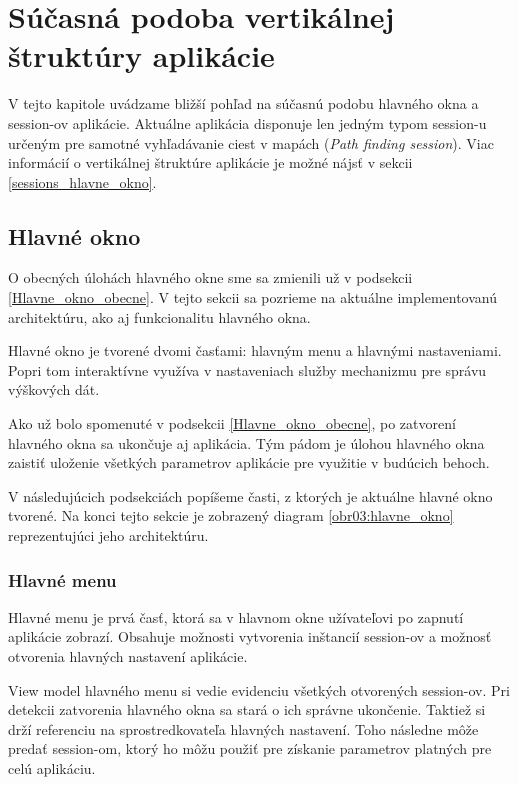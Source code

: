\chapter{Súčasná podoba vertikálnej štruktúry aplikácie}

V tejto kapitole uvádzame bližší pohľad na súčasnú podobu hlavného okna a session-ov aplikácie. Aktuálne aplikácia disponuje len jedným typom session-u určeným pre samotné vyhľadávanie ciest v mapách (\textit{Path finding session}). Viac informácií o vertikálnej štruktúre aplikácie je možné nájsť v sekcii \ref{sessions_hlavne_okno}.

\section{Hlavné okno}

O obecných úlohách hlavného okne sme sa zmienili už v podsekcii \ref{Hlavne_okno_obecne}. V tejto sekcii sa pozrieme na aktuálne implementovanú architektúru, ako aj funkcionalitu hlavného okna.


Hlavné okno je tvorené dvomi časťami: hlavným menu a hlavnými nastaveniami.
Popri tom interaktívne využíva v nastaveniach služby mechanizmu pre správu výškových dát.

Ako už bolo spomenuté v podsekcii \ref{Hlavne_okno_obecne}, po zatvorení hlavného okna sa ukončuje aj aplikácia. Tým pádom je úlohou hlavného okna zaistiť uloženie všetkých parametrov aplikácie pre využitie v budúcich behoch.

V následujúcich podsekciách popíšeme časti, z ktorých je aktuálne hlavné okno tvorené. Na konci tejto sekcie je zobrazený diagram \ref{obr03:hlavne_okno} reprezentujúci jeho architektúru.

\subsection{Hlavné menu}

Hlavné menu je prvá časť, ktorá sa v hlavnom okne užívateľovi po zapnutí aplikácie zobrazí. Obsahuje možnosti vytvorenia inštancií session-ov a možnosť otvorenia hlavných nastavení aplikácie. 

View model hlavného menu si vedie evidenciu všetkých otvorených session-ov. Pri detekcii zatvorenia hlavného okna sa stará o ich správne ukončenie. Taktiež si drží referenciu na sprostredkovateľa hlavných nastavení. Toho následne môže predať session-om, ktorý ho môžu použiť pre získanie parametrov platných pre celú aplikáciu.

